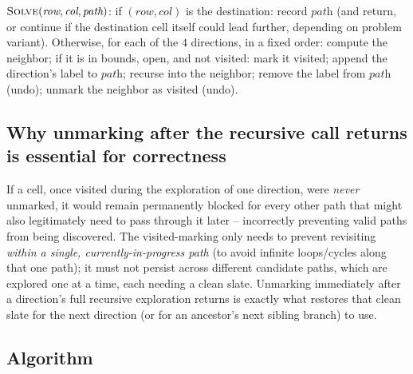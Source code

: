 \begin{ideabox}
$\textsc{Solve}(\textit{row}, \textit{col}, \textit{path})$: if
$(\textit{row},\textit{col})$ is the destination: record $\textit{path}$
(and return, or continue if the destination cell itself could lead
further, depending on problem variant). Otherwise, for each of the $4$
directions, in a fixed order: compute the neighbor; if it is in bounds,
open, and not visited: mark it visited; append the direction's label to
$\textit{path}$; recurse into the neighbor; remove the label from
$\textit{path}$ (undo); unmark the neighbor as visited (undo).
\end{ideabox}

\subsection*{Why unmarking after the recursive call returns is essential for correctness}

If a cell, once visited during the exploration of one direction, were
\emph{never} unmarked, it would remain permanently blocked for every
other path that might also legitimately need to pass through it later
-- incorrectly preventing valid paths from being discovered. The
visited-marking only needs to prevent revisiting \emph{within a single,
currently-in-progress path} (to avoid infinite loops/cycles along that
one path); it must not persist across different candidate paths, which
are explored one at a time, each needing a clean slate. Unmarking
immediately after a direction's full recursive exploration returns is
exactly what restores that clean slate for the next direction (or for an
ancestor's next sibling branch) to use.

\subsection*{Algorithm}

